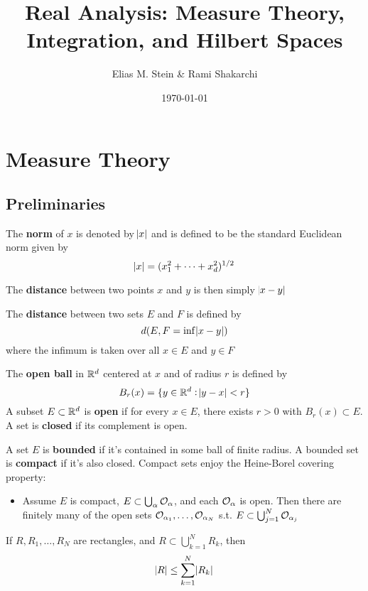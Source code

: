 \documentclass[11pt]{article}
\author{Elias M. Stein \& Rami Shakarchi}
\date{\today}
\title{Real Analysis: Measure Theory, Integration, and Hilbert Spaces}
\begin{document}
\maketitle
\tableofcontents \clearpage
\section{Measure Theory}
\label{sec:orgc24125d}
\subsection{Preliminaries}
\label{sec:orgaa6e18a}
The \textbf{norm} of \(x\) is denoted by \(\abs{x}\) and is defined to be the standard
Euclidean norm given by
\begin{equation*}
\abs{x}=(x_1^2+\dots+x_d^2)^{1/2}
\end{equation*}

The \textbf{distance} between two points \(x\) and \(y\) is then simply \(\abs{x-y}\)

The \textbf{distance} between two sets \(E\) and \(F\) is defined by
\begin{equation*}
d(E,F=\inf\abs{x-y})
\end{equation*}
where the infimum is taken over all \(x\in E\) and \(y\in F\)

The \textbf{open ball} in \(\mathbb{R}^d\) centered at \(x\) and of radius \(r\) is defined by
\begin{equation*}
B_r(x)=\{y\in\mathbb{R}^d:\abs{y-x}<r\}
\end{equation*}
A subset \(E\subset\mathbb{R}^d\) is \textbf{open} if for every \(x\in E\), there exists \(r>0\)
with \(B_r(x)\subset E\). A set is \textbf{closed} if its complement is open.

A set \(E\) is \textbf{bounded} if it's contained in some ball of finite radius. A
bounded set is \textbf{compact} if it's also closed. Compact sets enjoy the
Heine-Borel covering property:
\begin{itemize}
\item Assume \(E\) is compact, \(E\subset\bigcup_\alpha\mathcal{O}_\alpha\), and each
\(\mathcal{O}_\alpha\) is open. Then there are finitely many of the open sets
\(\mathcal{O}_{\alpha_1},\dots,\mathcal{O}_{\alpha_N}\) s.t.
\(E\subset\bigcup_{j=1}^N\mathcal{O}_{\alpha_j}\)
\end{itemize}


\begin{lemma}[]
\label{lemma1.2}
If \(R,R_1,\dots,R_N\) are rectangles, and \(R\subset\bigcup_{k=1}^NR_k\), then
\begin{equation*}
\abs{R}\le \displaystyle\sum_{k=1}^N\abs{R_k}
\end{equation*}
\end{lemma}
\end{document}
